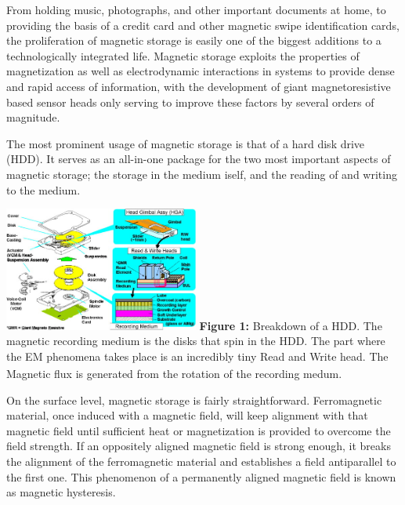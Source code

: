\documentclass[11pt]{article}
\begin{document}
\begin{multicols}{2} %
From holding music, photographs, and other important documents at home, to providing the basis of a credit card and other magnetic swipe identification cards, the proliferation of magnetic storage is easily one of the biggest additions to a technologically integrated life. Magnetic storage exploits the properties of magnetization as well as electrodynamic interactions in systems to provide dense and rapid access of information, with the development of giant magnetoresistive based sensor heads only serving to improve these factors by several orders of magnitude. 

The most prominent usage of magnetic storage is that of a hard disk drive (HDD). It serves as an all-in-one package for the two most important aspects of magnetic storage; the storage in the medium iself, and the reading of and writing to the medium.

\begin{center}
	\centering
	\includegraphics[width=0.48\textwidth]{HDD_makeup.png}
	{\footnotesize\textbf{Figure 1:} Breakdown of a HDD. The magnetic recording medium is the disks that spin in the HDD. The part where the EM phenomena takes place is an incredibly tiny Read and Write head\textsubscript{\cite{label6}}. The Magnetic flux is generated from the rotation of the recording medum. }
\end{center} 

On the surface level, magnetic storage is fairly straightforward. Ferromagnetic material, once induced with a magnetic field, will keep alignment with that magnetic field until sufficient heat or magnetization is provided to overcome the field strength. If an oppositely aligned magnetic field is strong enough, it breaks the alignment of the ferromagnetic material and establishes a field antiparallel to the first one. This phenomenon of a permanently aligned magnetic field is known as magnetic hysteresis\textsubscript{\cite{label1}}.


\end{multicols}
\end{document}
